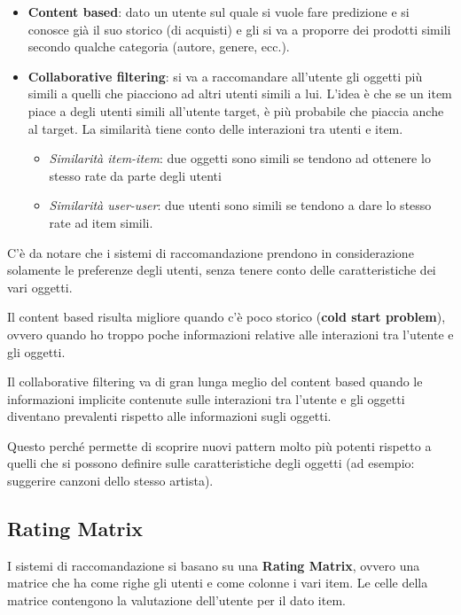 \begin{itemize}
\item
  \textbf{Content based}: dato un utente sul quale si vuole fare
  predizione e si conosce già il suo storico (di acquisti) e gli si va a
  proporre dei prodotti simili secondo qualche categoria (autore,
  genere, ecc.).
\item
  \textbf{Collaborative filtering}: si va a raccomandare all'utente gli oggetti
  più simili a quelli che piacciono ad altri utenti simili a lui.
  L'idea è che se un item piace a degli utenti simili all'utente target,
  è più probabile che piaccia anche al target. La similarità tiene conto
  delle interazioni tra utenti e item.

  \begin{itemize}
  \item
    \textit{Similarità item-item}: due oggetti sono simili se tendono ad ottenere
    lo stesso rate da parte degli utenti
  \item
    \textit{Similarità user-user}: due utenti sono simili se tendono a dare lo
    stesso rate ad item simili.
  \end{itemize}
\end{itemize}

C'è da notare che i sistemi di raccomandazione prendono in considerazione solamente le preferenze degli utenti, senza tenere conto delle caratteristiche dei vari oggetti.

Il content based risulta migliore quando c'è poco storico (\textbf{cold
start problem}), ovvero quando ho troppo poche informazioni relative
alle interazioni tra l'utente e gli oggetti.

Il collaborative filtering va di gran lunga meglio del content based
quando le informazioni implicite contenute sulle interazioni tra
l'utente e gli oggetti diventano prevalenti rispetto alle informazioni
sugli oggetti. 

Questo perché permette di scoprire nuovi pattern molto
più potenti rispetto a quelli che si possono definire sulle
caratteristiche degli oggetti (ad esempio: suggerire canzoni dello
stesso artista).

\subsection{Rating Matrix}\label{rating-matrix}

I sistemi di raccomandazione si basano su una \textbf{Rating Matrix}, ovvero una matrice che ha come righe gli utenti e come colonne i vari item. 
Le celle della matrice contengono la valutazione dell'utente per il dato
item.


